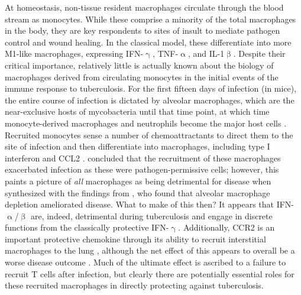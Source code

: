 At homeostasis, non\hyp{}tissue resident macrophages circulate through the blood stream as monocytes. While these comprise a minority of the total macrophages in the body, they are key respondents to sites of insult to mediate pathogen control and wound healing. In the classical model, these differentiate into more M1\hyp{}like macrophages, expressing IFN\hyp{}$\upgamma$, TNF\hyp{}$\upalpha$, and IL\hyp{}1$\upbeta$. Despite their critical importance, relatively little is actually known about the biology of macrophages derived from circulating monocytes in the initial events of the immune response to tuberculosis. For the first fifteen days of infection (in mice), the entire course of infection is dictated by alveolar macrophages, which are the near\hyp{}exclusive hosts of mycobacteria until that time point, at which time monocyte\hyp{}derived macrophages and neutrophils become the major host cells \citep{Cohen2018}. Recruited monocytes sense a number of chemoattractants to direct them to the site of infection and then differentiate into macrophages, including type I interferon and CCL2 \citep{Antonelli2010, Desvignes2012, Peters2001, Peters2004}. \citet{Antonelli2010} concluded that the recruitment of these macrophages exacerbated infection as these were pathogen\hyp{}permissive cells; however, this paints a picture of \textit{all} macrophages as being detrimental for disease when synthesized with the findings from \citet{Leemans2001}, who found that alveolar macrophage depletion ameliorated disease. What to make of this then? It appears that IFN\hyp{}$\upalpha$/$\upbeta$ are, indeed, detrimental during tuberculosis and engage in discrete functions from the classically protective IFN\hyp{}$\upgamma$. Additionally, CCR2 is an important protective chemokine through its ability to recruit interstitial macrophages to the lung \citep{Peters2001}, although the net effect of this appears to overall be a worse disease outcome \citep{Cambier2014b}. Much of the ultimate effect is ascribed to a failure to recruit T cells after infection, but clearly there are potentially essential roles for these recruited macrophages in directly protecting against tuberculosis. 

